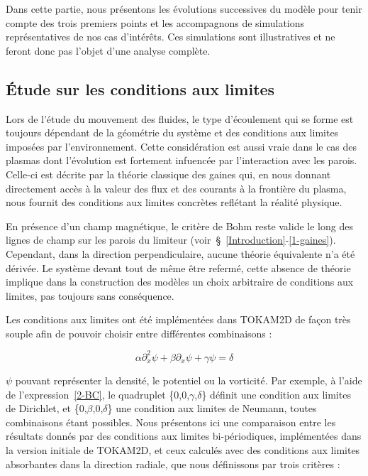 \begin{refsection}
Dans cette partie, nous présentons les évolutions successives du modèle pour
tenir compte des trois premiers points et les accompagnons de simulations
représentatives de nos cas d'intérêts. Ces simulations sont illustratives et
ne feront donc pas l'objet d'une analyse complète.

\subsection{Étude sur les conditions aux limites}
	
	Lors de l'étude du mouvement des fluides, le type d'écoulement qui se
	forme est toujours dépendant de la géométrie du système et des conditions aux limites
	imposées par l'environnement. Cette considération est aussi vraie dans le
	cas des plasmas dont l'évolution est fortement infuencée par l'interaction
	avec les parois. Celle-ci est décrite par la théorie classique des gaines qui, 
	en nous donnant directement accès à la valeur des flux et des courants à la
	frontière du plasma, nous fournit des conditions aux limites concrètes
	reflétant la réalité physique.
	
	En présence d'un champ magnétique, le critère de Bohm reste valide le long
	des lignes de champ sur les parois du limiteur
	(voir~\S~\ref{Introduction}-\ref{1-gaines}).
	Cependant, dans la direction perpendiculaire, aucune théorie équivalente n'a été dérivée. Le système devant
	tout de même être refermé, cette absence de théorie implique dans la
	construction des modèles un choix arbitraire de conditions aux limites, pas
	toujours sans conséquence.
	
	Les conditions aux limites ont été implémentées dans TOKAM2D de façon très
	souple afin de pouvoir choisir entre différentes combinaisons :
	
	\begin{equation}
	\label{2-BC}
		\alpha \partial^2_{x}\psi + \beta \partial_{x}\psi + \gamma \psi =
		\delta
	\end{equation}
	
	$\psi$ pouvant représenter la densité, le potentiel ou la vorticité. Par
	exemple, à l'aide de l'expression~\ref{2-BC}, le quadruplet
	\{0,0,$\gamma$,$\delta$\} définit une condition aux limites de Dirichlet, et
	\{0,$\beta$,0,$\delta$\} une condition aux limites de Neumann, toutes
	combinaisons étant possibles.
	Nous présentons ici une comparaison entre les résultats donnés par des
	conditions aux limites bi-périodiques, implémentées dans la version initiale de
	TOKAM2D, et ceux calculés avec des conditions aux limites absorbantes dans la
	direction radiale, que nous définissons par trois critères :
	

\end{refsection}
